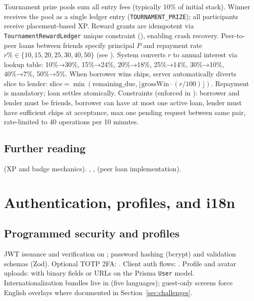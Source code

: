 \documentclass[11pt,a4paper]{article}
\begin{document}
Tournament prize pools sum all entry fees (typically 10\% of initial stack). Winner receives the pool as a single ledger entry (\texttt{TOURNAMENT\_PRIZE}); all participants receive placement-based XP. Reward grants are idempotent via \texttt{TournamentRewardLedger} unique constraint (), enabling crash recovery. Peer-to-peer loans between friends specify principal $P$ and repayment rate $r\% \in \{10, 15, 20, 25, 30, 40, 50\}$ (see ). System converts $r$ to annual interest via lookup table: 10\%→30\%, 15\%→24\%, 20\%→18\%, 25\%→14\%, 30\%→10\%, 40\%→7\%, 50\%→5\%. When borrower wins chips, server automatically diverts slice to lender: $\text{slice} = \min(\text{remaining\_due}, \lfloor \text{grossWin} \cdot (r/100) \rfloor)$. Repayment is mandatory; loan settles atomically. Constraints (enforced in ): borrower and lender must be friends, borrower can have at most one active loan, lender must have sufficient chips at acceptance, max one pending request between same pair, rate-limited to 40 operations per 10 minutes.

\subsection{Further reading}

 (XP and badge mechanics). , ,  (peer loan implementation).

\section{Authentication, profiles, and i18n}
\label{app:auth}

\subsection{Programmed security and profiles}

JWT issuance and verification on ; password hashing (bcrypt) and validation schemas (Zod). Optional TOTP 2FA: . Client auth flows: . Profile and avatar uploads:  with binary fields or URLs on the Prisma \texttt{User} model. Internationalization bundles live in  (five languages); guest-only screens force English overlays where documented in Section~\ref{sec:challenges}.
\end{document}
